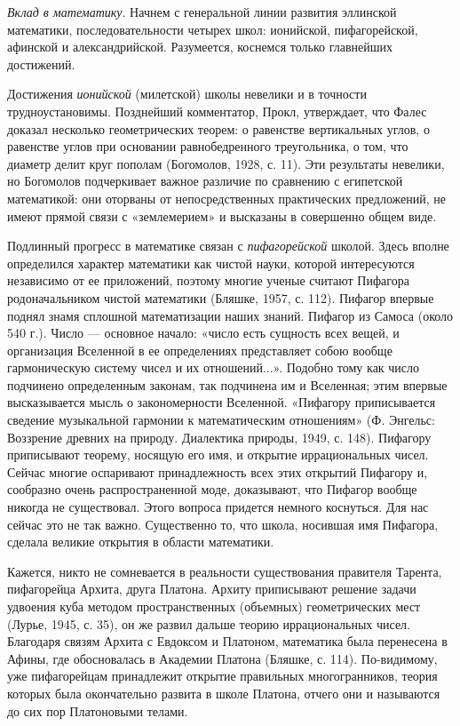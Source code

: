 \emph{Вклад в математику}. Начнем с генеральной линии развития
эллинской математики, последовательности четырех школ: ионийской,
пифагорейской, афинской и александрийской. Разумеется, коснемся только
главнейших достижений.

Достижения \emph{ионийской} (милетской) школы невелики и в точности
трудноустановимы. Позднейший комментатор, Прокл, утверждает, что Фалес
доказал несколько геометрических теорем: о равенстве вертикальных
углов, о равенстве углов при основании равнобедренного треугольника, о
том, что диаметр делит круг пополам (Богомолов, 1928, с. 11). Эти
результаты невелики, но Богомолов подчеркивает важное различие по
сравнению с египетской математикой: они оторваны от непосредственных
практических предложений, не имеют прямой связи с «землемерием» и
высказаны в совершенно общем виде.

Подлинный прогресс в математике связан с \emph{пифагорейской} школой.
Здесь вполне определился характер математики как чистой науки, которой
интересуются независимо от ее приложений, поэтому многие ученые
считают Пифагора родоначальником чистой математики (Бляшке, 1957, с.
112). Пифагор впервые поднял знамя сплошной математизации наших
знаний. Пифагор из Самоса (около 540 г.). Число --- основное начало:
«число есть сущность всех вещей, и организация Вселенной в ее
определениях представляет собою вообще гармоническую систему чисел и
их отношений...». Подобно тому как число подчинено определенным
законам, так подчинена им и Вселенная; этим впервые высказывается
мысль о закономерности Вселенной. «Пифагору приписывается сведение
музыкальной гармонии к математическим отношениям» (Ф. Энгельс:
Воззрение древних на природу. Диалектика природы, 1949, с. 148).
Пифагору приписывают теорему, носящую его имя, и открытие
иррациональных чисел. Сейчас многие оспаривают принадлежность всех
этих открытий Пифагору и, сообразно очень распространенной моде,
доказывают, что Пифагор вообще никогда не существовал. Этого вопроса
придется немного коснуться. Для нас сейчас это не так важно.
Существенно то, что школа, носившая имя Пифагора, сделала великие
открытия в области математики.

Кажется, никто не сомневается в реальности существования правителя
Тарента, пифагорейца Архита, друга Платона. Архиту приписывают решение
задачи удвоения куба методом пространственных (объемных)
геометрических мест (Лурье, 1945, с. 35), он же развил дальше теорию
иррациональных чисел. Благодаря связям Архита с Евдоксом и Платоном,
математика была перенесена в Афины, где обосновалась в Академии
Платона (Бляшке, с. 114). По-видимому, уже пифагорейцам принадлежит
открытие правильных многогранников, теория которых была окончательно
развита в школе Платона, отчего они и называются до сих пор
Платоновыми телами.

